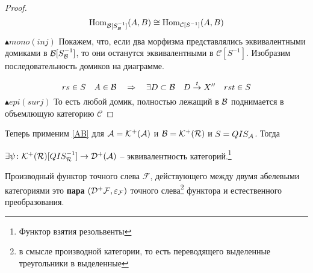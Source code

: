 \documentclass[../main.tex]{subfiles}
\begin{document}
\begin{proof}
    \[\operatorname{Hom}_{\mathcal{B}[S_{\mathcal{B}}^{-1}]} (A, B) \cong \operatorname{Hom}_{\mathcal{C}[S^{-1}]}(A, B) \]
    $\blacktriangle mono(inj)$ Покажем, что, если два морфизма представлялись эквивалентными домиками в $\mathcal{B}[S_{\mathcal{B}}^{-1}]$, то они останутся эквивалентными в $\mathcal{C}[S^{-1}]$. Изобразим последовательность домиков на диаграмме.
    \bee
    \eee
    \[rs \in S \quad A \in \mathcal{B} \quad \Rightarrow \quad \exists D \subset \mathcal{B} \quad D \overset{t}{\to}X'' \quad rst \in S \]
    $\blacktriangle epi(surj)$ То есть любой домик, полностью лежащий в $\mathcal{B}$ поднимается в объемлющую категорию $\mathcal{C}$
    \bee
    \eee
\end{proof}
Теперь применим \ref{AB} для $\mathcal{A} = \mathcal{K^+(\mathcal{A})}$ и $\mathcal{B} = \mathcal{K^+(\mathcal{R})}$ и $S = QIS_{\mathcal{A}}$. Тогда 
\begin{to_claim}
$\exists \psi\colon \mathcal{K^+(\mathcal{R})}[QIS_{\mathcal{R}}^{-1}]\to \mathcal{D^+(\mathcal{A})}$ -- эквивалентность категорий.\footnote{Функтор взятия резольвенты}
\end{to_claim}
\begin{to_def}
\label{derived_functor}
Производный функтор точного слева $\mathcal{F}$, действующего между двумя абелевыми категориями это \textbf{пара} $(\mathcal{D^+ F}, \varepsilon_{\mathcal{F}})$ точного слева\footnote{в смысле производной категории, то есть переводящего выделенные треугольники в выделенные} функтора и естественного преобразования.\\
\bee
{}
\eee
\bee
{}
\eee
\end{to_def}
\end{document}
